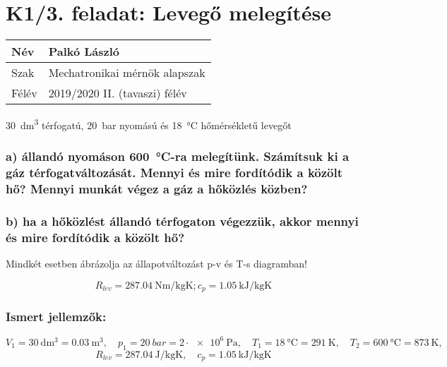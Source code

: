 \section*{K1/3. feladat: Levegő melegítése}

\begin{tabular}{ | p{2cm} | p{14cm} | } 
	\hline
	Név & Palkó László \\ 
	\hline
	Szak & Mechatronikai mérnök alapszak\\ 
	\hline
	Félév & 2019/2020 II. (tavaszi) félév \\ 
	\hline
\end{tabular}
\vspace{0.5cm}

\noindent \SI{30}{\dm\cubed} térfogatú, \SI{20}{\bar} nyomású és \SI{18}{\celsius} hőmérsékletű levegőt

\subsubsection*{a) állandó nyomáson  \SI{600}{\celsius}-ra melegítünk. Számítsuk ki a gáz térfogatváltozását. Mennyi és mire fordítódik a közölt hő? Mennyi munkát végez a gáz a hőközlés közben?}
\vspace{2mm}

\subsubsection*{b) ha a hőközlést állandó térfogaton végezzük, akkor mennyi és mire fordítódik a közölt hő?}

\noindent Mindkét esetben ábrázolja az állapotváltozást p-v és T-s diagramban! 

\begin{equation*}
	{R}_{lev}= \SI{287,04}{\newton\meter\per\kilogram\kelvin};c_p=\SI{1,05}{\kilo\joule\per\kilogram\kelvin} 
\end{equation*}

\subsubsection*{Ismert jellemzők:}

\begin{equation*}
V_1=\SI{30}{\deci\meter\cubed}=\SI{0,03}{\meter\cubed},
\quad
p_1=\SI{20}{bar}=2\cdot \SI{e6}{\pascal},
\quad
T_1=\SI{18}{\celsius}=\SI{291}{\kelvin},
\quad
T_2=\SI{600}{\celsius}=\SI{873}{\kelvin},
\quad
\end{equation*}
\begin{equation*}
R_{lev}=\SI{287,04}{\joule\per\kilogram\kelvin},
\quad
c_p=\SI{1,05}{\kilo\joule\per\kilogram\kelvin}
\end{equation*}

